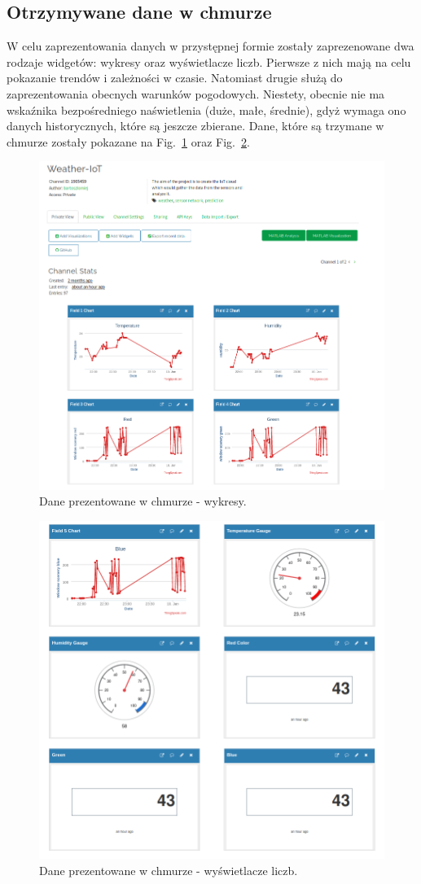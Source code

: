 \documentclass{article}
\begin{document}
\subsection{Otrzymywane dane w chmurze}
W celu zaprezentowania danych w przystępnej formie zostały zaprezenowane dwa rodzaje widgetów: wykresy oraz wyświetlacze liczb. Pierwsze z nich mają na celu pokazanie trendów i zależności w czasie. Natomiast drugie służą do zaprezentowania obecnych warunków pogodowych. Niestety, obecnie nie ma wskaźnika bezpośredniego naświetlenia (duże, małe, średnie), gdyż wymaga ono danych historycznych, które są jeszcze zbierane. Dane, które są trzymane w chmurze zostały pokazane na Fig.~\ref{fig:chm_2} oraz Fig.~\ref{fig:chm_1}.
\begin{figure}
  \centering
  \includegraphics[width=\textwidth]{chmura_2.png}
  \caption{Dane prezentowane w chmurze - wykresy.} \label{fig:chm_2}    
\end{figure}

\begin{figure}
  \centering
  \includegraphics[width=\textwidth]{chmura_1.png}
  \caption{Dane prezentowane w chmurze - wyświetlacze liczb.} \label{fig:chm_1}    
\end{figure}
\end{document}
